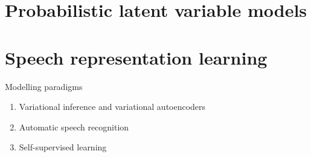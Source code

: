 





\section{Probabilistic latent variable models}




\section{Speech representation learning}





Modelling paradigms
\begin{enumerate}
    \item Variational inference and variational autoencoders
    \item Automatic speech recognition
    \item Self-supervised learning
\end{enumerate}


